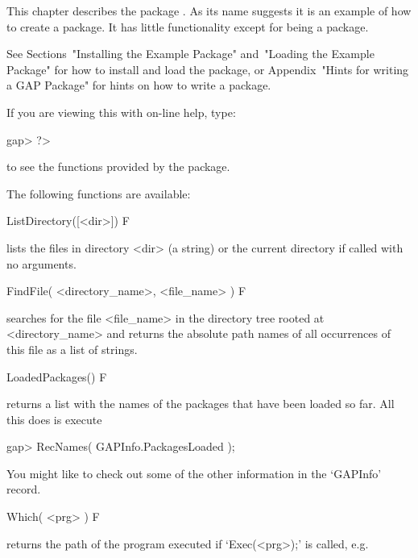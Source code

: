 

This chapter  describes  the  {\GAP}  package  {\Example}.  As  its  name
suggests it is an example of how to  create  a  {\GAP}  package.  It  has
little functionality except for being a package.

See Sections~"Installing the Example Package"  and~"Loading  the  Example
Package"  for  how  to  install  and  load  the  {\Example}  package,  or
Appendix~"Hints for writing a GAP Package" for hints on how  to  write  a
{\GAP} package.

If you are viewing this with on-line help, type: 

\beginexample
gap> ?>
\endexample

to see the functions provided by the {\Example} package.


The following functions are available:

\>ListDirectory([<dir>]) F

lists the files in directory <dir> (a string) or the current directory if
called with no arguments.

\>FindFile( <directory_name>, <file_name> ) F

searches  for the  file   <file_name> in  the  directory  tree  rooted at
<directory_name> and returns the absolute path names of  all  occurrences
of this file as a list of strings.

\>LoadedPackages() F

returns a list with the names of the packages that have  been  loaded  so
far. All this does is execute

\beginexample
gap> RecNames( GAPInfo.PackagesLoaded );
\endexample

You might like to check out some of the other information in the `GAPInfo'
record.

\>Which( <prg> ) F

returns the path of the program executed if `Exec(<prg>);' is called, e.g.

